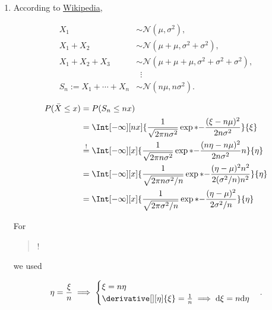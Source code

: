 \begin{solution}
\begin{enumerate}[label = (\alph*)]
        \item According to \href{https://en.wikipedia.org/wiki/Sum_of_normally_distributed_random_variables#:~:text=This%20means%20that%20the%20sum,squares%20of%20the%20standard%20deviations}{Wikipedia},

        \begin{align*}
            X_1                       & \sim \mathcal N(\mu, \sigma^2), \\
            X_1 + X_2                 & \sim \mathcal N(\mu + \mu, \sigma^2 + \sigma^2), \\
            X_1 + X_2 + X_3           & \sim \mathcal N(\mu + \mu + \mu, \sigma^2 + \sigma^2 + \sigma^2), \\
                                      & \, \, \, \vdots \\
            S_n := X_1 + \cdots + X_n & \sim \mathcal N(n \mu, n \sigma^2).
        \end{align*}

        \begin{align*}
            P(\bar X \leq x)
            & =
            P(S_n \leq n x) \\
            & =
            \Int[-\infty][n x]
            {
                \frac{1}{\sqrt{2 \pi n \sigma^2}}
                \exp*
                {
                    -\frac{(\xi - n \mu)^2}{2 n \sigma^2}
                }
            }{\xi} \\
            & \stackrel{!}{=}
            \Int[-\infty][x]
            {
                \frac{1}{\sqrt{2 \pi n \sigma^2}}
                \exp*
                {
                    -\frac{(n \eta - n \mu)^2}{2 n \sigma^2}
                }
                n
            }{\eta} \\
            & =
            \Int[-\infty][x]
            {
                \frac{1}{\sqrt{2 \pi n \sigma^2 / n}}
                \exp*
                {
                    -\frac{(\eta - \mu)^2 n^2}{2 (\sigma^2 / n) n^2}
                }
            }{\eta} \\
            & =
            \Int[-\infty][x]
            {
                \frac{1}{\sqrt{2 \pi \sigma^2 / n}}
                \exp*
                {
                    -\frac{(\eta - \mu)^2}{2 \sigma^2 / n}
                }
            }{\eta}
        \end{align*}

        For \blockquote{!} we used

        \begin{align*}
            \eta = \frac{\xi}{n}
            \implies
            \begin{cases}
                \xi = n \eta \\
                \derivative[][\eta]{\xi} = \frac{1}{n} \implies \mathrm d \xi = n \mathrm d \eta
            \end{cases}.
        \end{align*}

\end{enumerate}

\end{solution}

